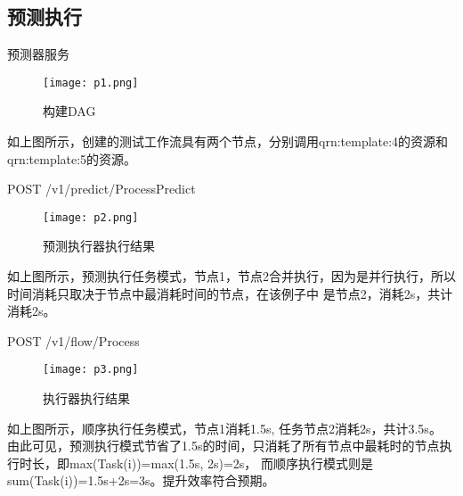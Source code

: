 \subsection{预测执行}

预测器服务

\begin{figure}[H]
    \centering
    \texttt{[image: p1.png]}
    \caption{构建DAG}
    \label{fig:6-3-2}
\end{figure}
如上图所示，创建的测试工作流具有两个节点，分别调用qrn:template:4的资源和qrn:template:5的资源。

POST /v1/predict/ProcessPredict

\begin{figure}[H]
    \centering
    \texttt{[image: p2.png]}
    \caption{预测执行器执行结果}
    \label{fig:6-3-3}
\end{figure}

如上图所示，预测执行任务模式，节点1，节点2合并执行，因为是并行执行，所以时间消耗只取决于节点中最消耗时间的节点，在该例子中
是节点2，消耗2s，共计消耗2s。

POST /v1/flow/Process

\begin{figure}[H]
    \centering
    \texttt{[image: p3.png]}
    \caption{执行器执行结果}
    \label{fig:6-3-3-res}
\end{figure}

如上图所示，顺序执行任务模式，节点1消耗1.5s, 任务节点2消耗2s，共计3.5s。
由此可见，预测执行模式节省了1.5s的时间，只消耗了所有节点中最耗时的节点执行时长，即max(Task(i))=max(1.5s, 2s)=2s，
而顺序执行模式则是sum(Task(i))=1.5s+2s=3s。提升效率符合预期。






